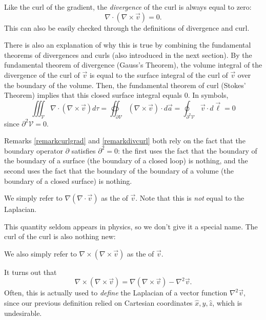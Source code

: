 Like the curl of the gradient, the \textit{divergence} of the curl is always equal to zero:
\[\nabla\cdot(\nabla\times \vec{v})=0.\]
This can also be easily checked through the definitions of divergence and curl.

\begin{remark}\label{remarkdivcurl}
There is also an explanation of why this is true by combining the fundamental theorems of divergences and curls (also introduced in the next section). By the fundamental theorem of divergence (Gauss's Theorem), the volume integral of the divergence of the curl of $\vec{v}$ is equal to the surface integral of the curl of $\vec{v}$ over the boundary of the volume. Then, the fundamental theorem of curl (Stokes' Theorem) implies that this closed surface integral equals 0. In symbols,
\[\iiint_\mathcal{V}\nabla\cdot(\nabla\times \vec{v}) d\tau=\oiint_{\partial\mathcal{V}}(\nabla\times\vec{v})\cdot d\vec{a}=\oint_{\partial^2\mathcal{V}}\vec{v}\cdot d\vec{\ell}=0\]
since $\partial^2\mathcal{V}=0$.
\end{remark}

\begin{remark}
Remarks \ref{remarkcurlgrad} and \ref{remarkdivcurl} both rely on the fact that the boundary operator $\partial$ satisfies $\partial^2=0$: the first uses the fact that the boundary of the boundary of a surface (the boundary of a closed loop) is nothing, and the second uses the fact that the boundary of the boundary of a volume (the boundary of a closed surface) is nothing.
\end{remark}

\begin{definition}
    We simply refer to $\nabla(\nabla\cdot \vec{v})$ as the  of $\vec{v}$. Note that this is \textit{not} equal to the Laplacian.
\end{definition}

This quantity seldom appears in physics, so we don't give it a special name. The curl of the curl is also nothing new:

\begin{definition}
    We also simply refer to $\nabla\times(\nabla \times \vec{v})$ as the  of $\vec{v}$.
\end{definition}

It turns out that
\[\nabla\times(\nabla\times \vec{v})=\nabla(\nabla\times \vec{v})-\nabla^2\vec{v}.\]
Often, this is actually used to \textit{define} the Laplacian of a vector function $\nabla^2\vec{v}$, since our previous definition relied on Cartesian coordinates $\hat{x}, \hat{y}, \hat{z}$, which is undesirable.

